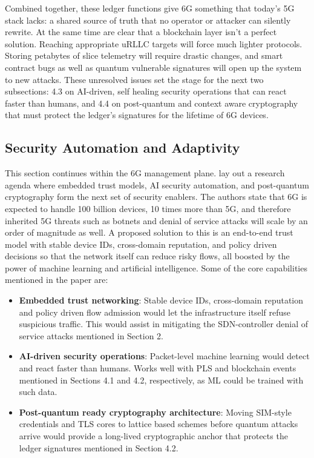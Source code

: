 \documentclass[acmtog]{acmart}
\begin{document}
Combined together, these ledger functions give 6G something that today's 5G stack lacks: a shared source of truth that no operator or attacker can silently rewrite. At the same time \cite{ref2} are clear that a blockchain layer isn't a perfect solution. Reaching appropriate uRLLC targets will force much lighter protocols. Storing petabytes of slice telemetry will require drastic changes, and smart contract bugs as well as quantum vulnerable signatures will open up the system to new attacks. These unresolved issues set the stage for the next two subsections: 4.3 on AI-driven, self healing security operations that can react faster than humans, and 4.4 on post-quantum and context aware cryptography that must protect the ledger's signatures for the lifetime of 6G devices.

\subsection{Security Automation and Adaptivity}
This section continues within the 6G management plane.  \cite{ref5} lay out a research agenda where embedded trust models, AI security automation, and post-quantum cryptography form the next set of security enablers. The authors state that 6G is expected to handle 100 billion devices, 10 times more than 5G, and therefore inherited 5G threats such as botnets and denial of service attacks will scale by an order of magnitude as well. A proposed solution to this is an end-to-end trust model with stable device IDs, cross-domain reputation, and policy driven decisions so that the network itself can reduce risky flows, all boosted by the power of machine learning and artificial intelligence. Some of the core capabilities mentioned in the paper are:
\begin{itemize}
  \item \textbf{Embedded trust networking}: Stable device IDs, cross-domain reputation and policy driven flow admission would let the infrastructure itself refuse suspicious traffic. This would assist in mitigating the SDN-controller denial of service attacks mentioned in Section 2.
  \item \textbf{AI-driven security operations}: Packet-level machine learning would detect and react faster than humans. Works well with PLS and blockchain events mentioned in Sections 4.1 and 4.2, respectively, as ML could be trained with such data.
  \item \textbf{Post-quantum ready cryptography architecture}:  Moving SIM-style credentials and TLS cores to lattice based schemes before quantum attacks arrive would provide a long-lived cryptographic anchor that protects the ledger signatures mentioned in Section 4.2.
\end{itemize}
\end{document}
